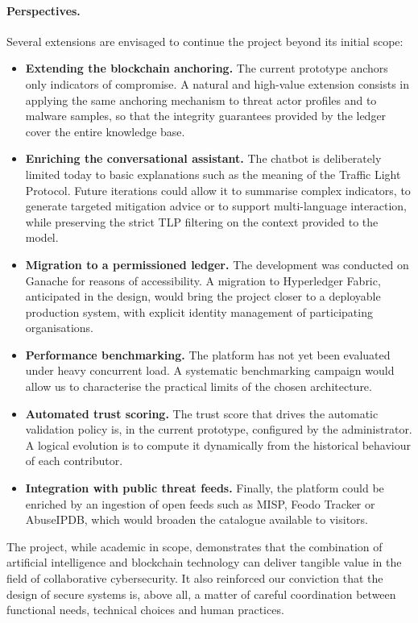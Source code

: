 \documentclass[12pt,a4paper,oneside]{book}
\begin{document}
{{\paragraph{Perspectives.} Several extensions are envisaged to continue the
project beyond its initial scope:

\begin{itemize}
\item \textbf{Extending the blockchain anchoring.} The current prototype
anchors only indicators of compromise. A natural and high-value extension
consists in applying the same anchoring mechanism to threat actor profiles
and to malware samples, so that the integrity guarantees provided by the
ledger cover the entire knowledge base.
\item \textbf{Enriching the conversational assistant.} The chatbot is
deliberately limited today to basic explanations such as the meaning of
the Traffic Light Protocol. Future iterations could allow it to summarise
complex indicators, to generate targeted mitigation advice or to support
multi-language interaction, while preserving the strict TLP filtering on
the context provided to the model.
\item \textbf{Migration to a permissioned ledger.} The development was
conducted on Ganache for reasons of accessibility. A migration to
Hyperledger Fabric, anticipated in the design, would bring the project
closer to a deployable production system, with explicit identity management
of participating organisations.
\item \textbf{Performance benchmarking.} The platform has not yet been
evaluated under heavy concurrent load. A systematic benchmarking campaign
would allow us to characterise the practical limits of the chosen
architecture.
\item \textbf{Automated trust scoring.} The trust score that drives the
automatic validation policy is, in the current prototype, configured by
the administrator. A logical evolution is to compute it dynamically from
the historical behaviour of each contributor.
\item \textbf{Integration with public threat feeds.} Finally, the platform
could be enriched by an ingestion of open feeds such as MISP, Feodo
Tracker or AbuseIPDB, which would broaden the catalogue available to
visitors.
\end{itemize}

The project, while academic in scope, demonstrates that the combination of
artificial intelligence and blockchain technology can deliver tangible
value in the field of collaborative cybersecurity. It also reinforced our
conviction that the design of secure systems is, above all, a matter of
careful coordination between functional needs, technical choices and human
practices.

}}
\end{document}
